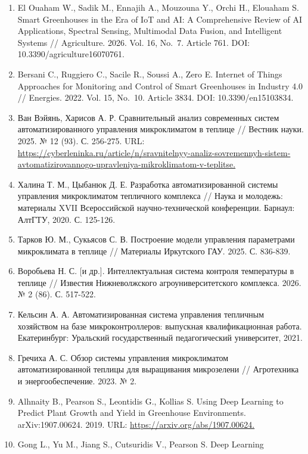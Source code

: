 \documentclass[a4paper,14pt]{extarticle}
\providecommand{\tightlist}{%
  \setlength{\itemsep}{0pt}\setlength{\parskip}{0pt}}
\begin{document}
\begin{enumerate}
\def\labelenumi{\arabic{enumi}.}
\tightlist
\item
  El Ouaham W., Sadik M., Ennajih A., Mouzouna Y., Orchi H., Elouaham S.
  Smart Greenhouses in the Era of IoT and AI: A Comprehensive Review of
  AI Applications, Spectral Sensing, Multimodal Data Fusion, and
  Intelligent Systems // Agriculture. 2026. Vol. 16, No.~7. Article 761.
  DOI: 10.3390/agriculture16070761.
\item
  Bersani C., Ruggiero C., Sacile R., Soussi A., Zero E. Internet of
  Things Approaches for Monitoring and Control of Smart Greenhouses in
  Industry 4.0 // Energies. 2022. Vol. 15, No.~10. Article 3834. DOI:
  10.3390/en15103834.
\item
  Ван Вэйянь, Харисов А. Р. Сравнительный анализ современных систем
  автоматизированного управления микроклиматом в теплице // Вестник
  науки. 2025. № 12 (93). С. 256-275. URL:
  \url{https://cyberleninka.ru/article/n/sravnitelnyy-analiz-sovremennyh-sistem-avtomatizirovannogo-upravleniya-mikroklimatom-v-teplitse.}
\item
  Халина Т. М., Цыбанюк Д. Е. Разработка автоматизированной системы
  управления микроклиматом тепличного комплекса // Наука и молодежь:
  материалы XVII Всероссийской научно-технической конференции. Барнаул:
  АлтГТУ, 2020. С. 125-126.
\item
  Тарков Ю. М., Сукьясов С. В. Построение модели управления параметрами
  микроклимата в теплице // Материалы Иркутского ГАУ. 2025. С. 836-839.
\item
  Воробьева Н. С. {[}и др.{]}. Интеллектуальная система контроля
  температуры в теплице // Известия Нижневолжского агроуниверситетского
  комплекса. 2026. № 2 (86). С. 517-522.
\item
  Кельсин А. А. Автоматизированная система управления тепличным
  хозяйством на базе микроконтроллеров: выпускная квалификационная
  работа. Екатеринбург: Уральский государственный педагогический
  университет, 2021.
\item
  Гречиха А. С. Обзор системы управления микроклиматом
  автоматизированной теплицы для выращивания микрозелени // Агротехника
  и энергообеспечение. 2023. № 2.
\item
  Alhnaity B., Pearson S., Leontidis G., Kollias S. Using Deep Learning
  to Predict Plant Growth and Yield in Greenhouse Environments.
  arXiv:1907.00624. 2019. URL: \url{https://arxiv.org/abs/1907.00624.}
\item
  Gong L., Yu M., Jiang S., Cutsuridis V., Pearson S. Deep Learning

\end{enumerate}
\end{document}
